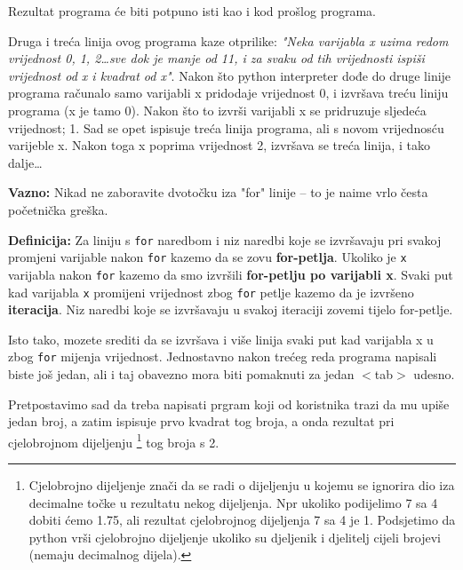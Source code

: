 
Rezultat programa će biti potpuno isti kao i kod prošlog programa.

Druga i treća linija ovog programa kaze otprilike: \emph{"Neka
varijabla x uzima redom vrijednost 0, 1, 2\dots sve dok je manje
od 11, i za svaku od tih vrijednosti ispiši vrijednost od x i
kvadrat od x"}. Nakon što python interpreter dođe do druge linije
programa računalo samo varijabli x pridodaje vrijednost 0, i
izvršava treću liniju programa (x je tamo 0). Nakon što to
izvrši varijabli x se pridruzuje sljedeća vrijednost; 1. Sad se
opet ispisuje treća linija programa, ali s novom vrijednosću
varijeble x. Nakon toga x poprima vrijednost 2, izvršava se treća
linija, i tako dalje\dots

\textbf{Vazno:}
Nikad ne zaboravite dvotočku iza "for" linije -- to je naime vrlo
česta početnička greška.

\textbf{Definicija:} Za liniju s \verb"for" naredbom i niz naredbi koje
se izvršavaju pri svakoj promjeni varijable nakon \verb"for"
kazemo da se zovu \textbf{for-petlja}. Ukoliko je \verb"x" varijabla
nakon \verb"for" kazemo da smo izvršili \textbf{for-petlju po varijabli
x}. Svaki put kad varijabla \verb"x" promijeni vrijednost zbog \verb"for"
petlje kazemo da je izvršeno \textbf{iteracija}. Niz naredbi koje se
izvršavaju u svakoj iteraciji zovemi tijelo for-petlje.

Isto tako, mozete srediti da se izvršava i više linija svaki
put kad varijabla x u zbog \verb"for" mijenja vrijednost. Jednostavno
nakon trećeg reda programa napisali biste još jedan, ali i taj
obavezno mora biti pomaknuti za jedan $<$tab$>$ udesno.

Pretpostavimo sad da treba napisati prgram koji od koristnika trazi
da mu upiše jedan broj, a zatim ispisuje prvo kvadrat tog broja,
a onda rezultat pri cjelobrojnom dijeljenju 
\footnote{
	Cjelobrojno dijeljenje znači da se radi o dijeljenju u
	kojemu se ignorira dio iza decimalne točke u rezultatu
	nekog dijeljenja. Npr ukoliko podijelimo 7 sa 4 dobiti
	ćemo 1.75, ali rezultat cjelobrojnog dijeljenja 7 sa 4 je
	1. Podsjetimo da python vrši cjelobrojno dijeljenje ukoliko
	su djeljenik i djelitelj cijeli brojevi (nemaju decimalnog
	dijela).
}
tog broja s 2.


